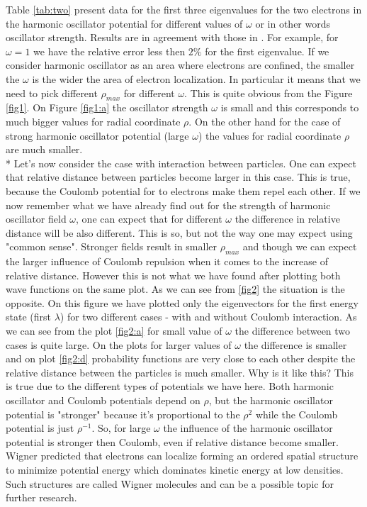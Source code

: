 \documentclass[10pt]{article}
\begin{document}
Table \ref{tab:two} present data for the first three eigenvalues for the two electrons in the harmonic oscillator potential for different values of $\omega$ or in other words oscillator strength. Results are in agreement with those in \cite{three}. For example, for $\omega=1$ we have the relative error less then $2\%$ for the first eigenvalue. If we consider harmonic oscillator as an area where electrons are confined, the smaller the $\omega$ is the wider the area of electron localization. In particular it means that we need to pick different $\rho_{max}$ for different $\omega$. This is quite obvious from the Figure \ref{fig1}. On Figure \ref{fig1:a} the oscillator strength $\omega$ is small and this corresponds to much bigger values for radial coordinate $\rho$. On the other hand for the case of strong harmonic oscillator potential (large $\omega$) the values for radial coordinate $\rho$ are much smaller.\\*
Let's now consider the case with interaction between particles. One can expect that relative distance between particles become larger in this case. This is true, because the Coulomb potential for to electrons make them repel each other. If we now remember what we have already find out for the strength of harmonic oscillator field  $\omega$, one can expect that for different $\omega$ the difference in relative distance will be also different. This is so, but not the way one may expect using "common sense". Stronger fields result in smaller   $\rho_{max}$ and though we can expect the larger influence of Coulomb repulsion when it comes to the increase of relative distance. However this is not what we have found after plotting both wave functions on the same plot. As we can see from \ref{fig2} the situation is the opposite. On this figure we have plotted only the eigenvectors for the first energy state (first $\lambda$) for two different cases - with and without Coulomb interaction. As we can see from the plot \ref{fig2:a} for small value of $\omega$ the difference between two cases is quite large. On the plots for larger values of $\omega$ the difference is smaller and on plot \ref{fig2:d} probability functions are very close to each other despite the relative distance between the particles is much smaller. Why is it like this? This is true due to the different types of potentials we have here. Both harmonic oscillator and Coulomb potentials depend on $\rho$, but the harmonic oscillator potential is "stronger" because it's proportional to the $\rho^{2}$ while the Coulomb potential is just $\rho^{-1}$. So, for large $\omega$ the influence of the harmonic oscillator potential is stronger then Coulomb, even if relative distance become smaller.
Wigner predicted\cite{wigner} that electrons can localize forming an ordered spatial structure to minimize potential energy which dominates kinetic energy at low densities. Such structures are called Wigner molecules and can be a possible topic for further research.
\end{document}
